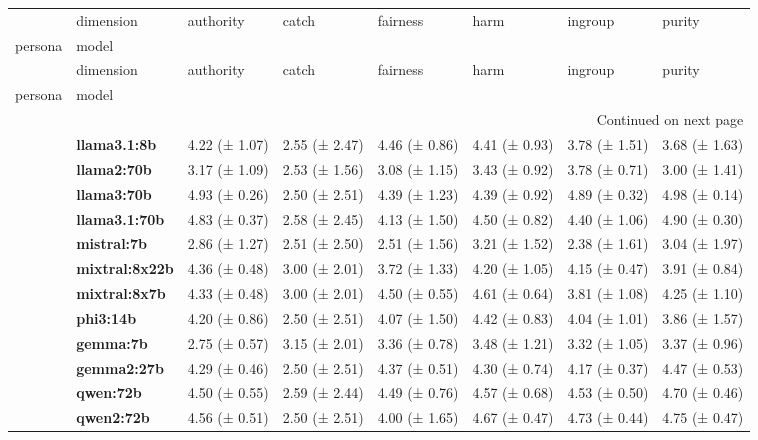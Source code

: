 \begin{longtable}{llllllll}
\toprule
 & dimension & authority & catch & fairness & harm & ingroup & purity \\
persona & model &  &  &  &  &  &  \\
\midrule
\endfirsthead
\toprule
 & dimension & authority & catch & fairness & harm & ingroup & purity \\
persona & model &  &  &  &  &  &  \\
\midrule
\endhead
\midrule
\multicolumn{8}{r}{Continued on next page} \\
\midrule
\endfoot
\bottomrule
\endlastfoot
\multirow[t]{12}{*}{\textbf{conservative}} & \textbf{llama3.1:8b} & 4.22 (± 1.07) & 2.55 (± 2.47) & 4.46 (± 0.86) & 4.41 (± 0.93) & 3.78 (± 1.51) & 3.68 (± 1.63) \\
\textbf{} & \textbf{llama2:70b} & 3.17 (± 1.09) & 2.53 (± 1.56) & 3.08 (± 1.15) & 3.43 (± 0.92) & 3.78 (± 0.71) & 3.00 (± 1.41) \\
\textbf{} & \textbf{llama3:70b} & 4.93 (± 0.26) & 2.50 (± 2.51) & 4.39 (± 1.23) & 4.39 (± 0.92) & 4.89 (± 0.32) & 4.98 (± 0.14) \\
\textbf{} & \textbf{llama3.1:70b} & 4.83 (± 0.37) & 2.58 (± 2.45) & 4.13 (± 1.50) & 4.50 (± 0.82) & 4.40 (± 1.06) & 4.90 (± 0.30) \\
\textbf{} & \textbf{mistral:7b} & 2.86 (± 1.27) & 2.51 (± 2.50) & 2.51 (± 1.56) & 3.21 (± 1.52) & 2.38 (± 1.61) & 3.04 (± 1.97) \\
\textbf{} & \textbf{mixtral:8x22b} & 4.36 (± 0.48) & 3.00 (± 2.01) & 3.72 (± 1.33) & 4.20 (± 1.05) & 4.15 (± 0.47) & 3.91 (± 0.84) \\
\textbf{} & \textbf{mixtral:8x7b} & 4.33 (± 0.48) & 3.00 (± 2.01) & 4.50 (± 0.55) & 4.61 (± 0.64) & 3.81 (± 1.08) & 4.25 (± 1.10) \\
\textbf{} & \textbf{phi3:14b} & 4.20 (± 0.86) & 2.50 (± 2.51) & 4.07 (± 1.50) & 4.42 (± 0.83) & 4.04 (± 1.01) & 3.86 (± 1.57) \\
\textbf{} & \textbf{gemma:7b} & 2.75 (± 0.57) & 3.15 (± 2.01) & 3.36 (± 0.78) & 3.48 (± 1.21) & 3.32 (± 1.05) & 3.37 (± 0.96) \\
\textbf{} & \textbf{gemma2:27b} & 4.29 (± 0.46) & 2.50 (± 2.51) & 4.37 (± 0.51) & 4.30 (± 0.74) & 4.17 (± 0.37) & 4.47 (± 0.53) \\
\textbf{} & \textbf{qwen:72b} & 4.50 (± 0.55) & 2.59 (± 2.44) & 4.49 (± 0.76) & 4.57 (± 0.68) & 4.53 (± 0.50) & 4.70 (± 0.46) \\
\textbf{} & \textbf{qwen2:72b} & 4.56 (± 0.51) & 2.50 (± 2.51) & 4.00 (± 1.65) & 4.67 (± 0.47) & 4.73 (± 0.44) & 4.75 (± 0.47) \\

\end{longtable}

